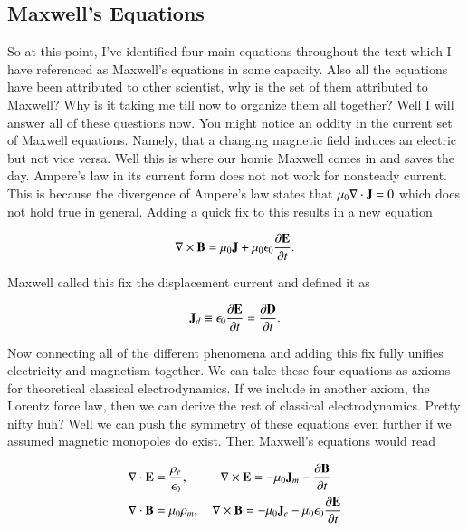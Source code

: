 \documentclass[preprint, review,12pt]{elsarticle}
\def\x{\times}
\def\.{\cdot}
\def\b{\textbf}
\def\={\equiv}
\def\div{\nabla \.}
\def\curl{\nabla \x}
\newcommand{\pd}[2]{\frac{\partial #1 }{\partial #2}}
\begin{document}
\subsection{Maxwell's Equations}

So at this point, I've identified four main equations throughout the text which I have referenced as Maxwell's equations in some capacity. Also all the equations have been attributed to other scientist, why is the set of them attributed to Maxwell? Why is it taking me till now to organize them all together? Well I will answer all of these questions now. You might notice an oddity in the current set of Maxwell equations. Namely, that a changing magnetic field induces an electric but not vice versa. Well this is where our homie Maxwell comes in and saves the day. Ampere's law in its current form does not not work for nonsteady current. This is because the divergence of Ampere's law states that $\mu_0 \div \b J = 0$ which does not hold true in general. Adding a quick fix to this results in a new equation

\begin{equation}
    \curl \b B = \mu_0 \b J + \mu_0 \epsilon_0 \pd{\b E}{t}.
\end{equation}

Maxwell called this fix the displacement current and defined it as 

\begin{equation}
    \b J_d \= \epsilon_0 \pd{\b E}{t} = \pd{\b D}{t}.
\end{equation}

Now connecting all of the different phenomena and adding this fix fully unifies electricity and magnetism together. We can take these four equations as axioms for theoretical classical electrodynamics. If we include in another axiom, the Lorentz force law, then we can derive the rest of classical electrodynamics. Pretty nifty huh? Well we can push the symmetry of these equations even further if we assumed magnetic monopoles do exist. Then Maxwell's equations would read

\begin{equation}
\begin{split}
        & \div \b E  = \frac{\rho_e}{\epsilon_0}, \hspace{25.50pt} \curl \b E  = -\mu_0 \b J_m - \pd{\b B}{t} \\
        & \div \b B  = \mu_0 \rho_m, \quad  \curl \b B  = -\mu_0 \b J_e - \mu_0\epsilon_0\pd{\b E}{t}\\
\end{split}
\end{equation}
\end{document}

